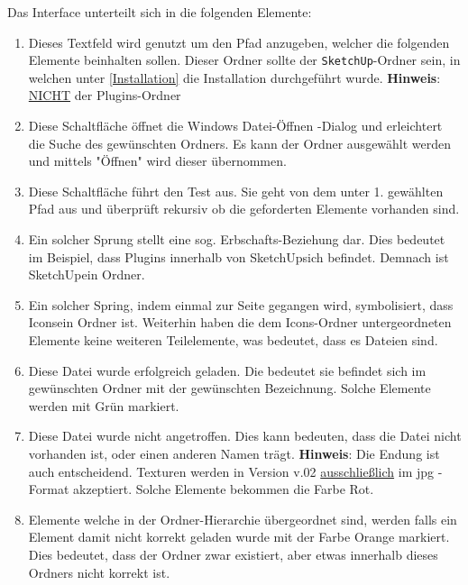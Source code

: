 \documentclass{book}
\newcommand{\sketchup}{\texttt{SketchUp}\xspace}
\newcommand{\hinweis}[1]{\newline \textbf{Hinweis}: #1 \newline}
\newcommand{\green}[1]{\color{green!50!black}#1\color{black}\xspace}
\newcommand{\red}[1]{\color{red}#1\color{black}\xspace}
\newcommand{\orange}[1]{\color{orange}#1\color{black}\xspace}
\begin{document}
			Das Interface unterteilt sich in die folgenden Elemente:
			\begin{enumerate}
				\item Dieses Textfeld wird genutzt um den Pfad anzugeben, welcher die folgenden Elemente beinhalten sollen. Dieser Ordner sollte der \sketchup-Ordner sein, in welchen unter \ref{Installation} die Installation durchgeführt wurde. \hinweis{\underline{NICHT} der Plugins-Ordner}
				\item Diese Schaltfläche öffnet die Windows \glqq Datei-Öffnen \grqq-Dialog und erleichtert die Suche des gewünschten Ordners. Es kann der Ordner ausgewählt werden und mittels "Öffnen" wird dieser übernommen.
				\item Diese Schaltfläche führt den Test aus. Sie geht von dem unter 1. gewählten Pfad aus und überprüft rekursiv ob die geforderten Elemente vorhanden sind. 
				\item Ein solcher Sprung stellt eine sog. Erbschafts-Beziehung dar. Dies bedeutet im Beispiel, dass \glqq Plugins \grqq innerhalb von \glqq SketchUp\grqq sich befindet. Demnach ist \glqq SketchUp\grqq ein Ordner. 
				\item Ein solcher Spring, indem einmal zur Seite gegangen wird, symbolisiert, dass \glqq Icons\grqq ein Ordner ist. Weiterhin haben die dem \glqq Icons\grqq -Ordner untergeordneten Elemente keine weiteren Teilelemente, was bedeutet, dass es Dateien sind.
				\item Diese Datei wurde erfolgreich geladen. Die bedeutet sie befindet sich im gewünschten Ordner mit der gewünschten Bezeichnung. Solche Elemente werden mit \green{Grün} markiert.
				\item Diese Datei wurde nicht angetroffen. Dies kann bedeuten, dass die Datei nicht vorhanden ist, oder einen anderen Namen trägt. \hinweis{Die Endung ist auch entscheidend. Texturen werden in Version v.02 \underline{ausschließlich} im \glqq jpg \grqq-Format akzeptiert.}
				Solche Elemente bekommen die Farbe \red{Rot}.
				\item Elemente welche in der Ordner-Hierarchie übergeordnet sind, werden falls ein Element damit nicht korrekt geladen wurde mit der Farbe \orange{Orange} markiert. Dies bedeutet, dass der Ordner zwar existiert, aber etwas innerhalb dieses Ordners nicht korrekt ist. 
			\end{enumerate}			
		
\end{document}
